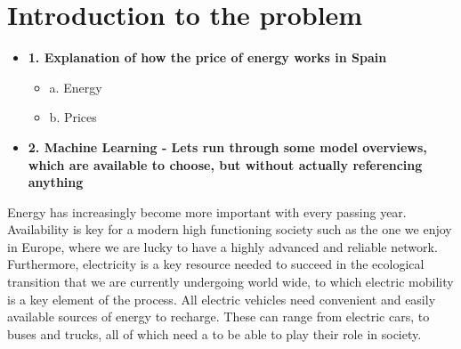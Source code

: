 \documentclass[12pt]{report} %
\begin{document}

\tableofcontents
\thispagestyle{fancy}



\newpage %
\thispagestyle{empty}
\mbox{}



\listoffigures
\thispagestyle{fancy}



\listoftables
\thispagestyle{fancy}



\clearpage
{} %





\chapter{Introduction to the problem}
    \begin{itemize}
    \item \textbf{1. Explanation of how the price of energy works in Spain}
        \begin{itemize}
        \item a. Energy
        \item b. Prices
        \end{itemize}
    \item \textbf{2. Machine Learning - Lets run through some model overviews, which are available to choose, but without actually referencing anything}
    \end{itemize}

Energy has increasingly become more important with every passing year. Availability is key for a modern high functioning society such as the one we enjoy in Europe, where we are lucky to have a highly advanced and reliable network. Furthermore, electricity is a key resource needed to succeed in the ecological transition that we are currently undergoing world wide, to which electric mobility is a key element of the process. All electric vehicles need convenient and easily available sources of energy to recharge. These can range from electric cars, to buses and trucks, all of which need a to be able to play their role in society.
\end{document}
